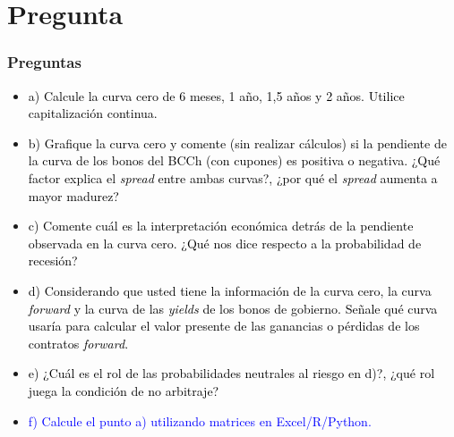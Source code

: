 \documentclass{beamer}
\begin{document}
\section{Pregunta }
\begin{frame}
  \frametitle{Preguntas}
  \begin{itemize}
    \scriptsize
    \item {\textcolor{black}{a) Calcule la curva cero de 6 meses, 1 año, 1,5 años y 2 años. Utilice capitalización continua.}}
    \vspace{3pt}
    \item {\textcolor{black}{b) Grafique la curva cero y comente (sin realizar cálculos) si la pendiente de la curva de los bonos del BCCh (con cupones) es positiva o negativa. ¿Qué factor explica el \textit{spread} entre ambas curvas?, ¿por qué el \textit{spread} aumenta a mayor madurez?}}
    \vspace{3pt}
    \item {\textcolor{black}{c) Comente cuál es la interpretación económica detrás de la pendiente observada en la curva cero. ¿Qué nos dice respecto a la probabilidad de recesión?}}
    \vspace{3pt}
    \item {\textcolor{black}{d) Considerando que usted tiene la información de la curva cero, la curva \textit{forward} y la curva de las \textit{yields} de los bonos de gobierno. Señale qué curva usaría para calcular el valor presente de las ganancias o pérdidas de los contratos \textit{forward}.}}
    \vspace{3pt}
    \item {\textcolor{black}{e) ¿Cuál es el rol de las probabilidades neutrales al riesgo en d)?, ¿qué rol juega la condición de no arbitraje?}}
    \vspace{3pt}
    \item {\Large\textcolor{blue}{f) Calcule el punto a) utilizando matrices en Excel/R/Python.}}
    \vspace{3pt}
  \end{itemize}
\end{frame}
\end{document}
